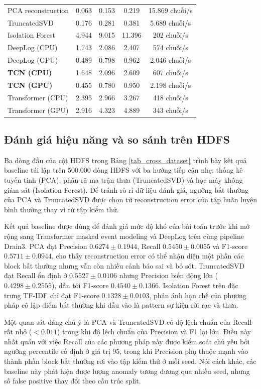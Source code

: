\documentclass[conference]{IEEEtran}
\begin{document}
\begin{table}[!t]
\begin{minipage}[t]{0.48\textwidth}
\begin{center}
\begin{tabular}{lcccc}
PCA reconstruction & 0.063 & 0.153 & 0.219 & 15.869 chuỗi/s \\
TruncatedSVD & 0.176 & 0.281 & 0.381 & 5.689 chuỗi/s \\
Isolation Forest & 4.944 & 9.015 & 11.396 & 202 chuỗi/s \\
DeepLog (CPU) & 1.743 & 2.086 & 2.407 & 574 chuỗi/s \\
DeepLog (GPU) & 0.489 & 0.798 & 0.962 & 2.046 chuỗi/s \\
\textbf{TCN (CPU)} & 1.648 & 2.096 & 2.609 & 607 chuỗi/s \\
\textbf{TCN (GPU)} & 0.455 & 0.780 & 0.950 & 2.198 chuỗi/s \\
Transformer (CPU) & 2.395 & 2.966 & 3.267 & 418 chuỗi/s \\
Transformer (GPU) & 2.916 & 4.323 & 4.889 & 343 chuỗi/s \\
\bottomrule
\end{tabular}
\label{tab_latency}
\end{center}
\end{minipage}
\end{table}

\subsection{Đánh giá hiệu năng và so sánh trên HDFS}
Ba dòng đầu của cột HDFS trong Bảng \ref{tab_cross_dataset} trình bày kết quả baseline tái lập trên 500.000 dòng HDFS với ba hướng tiếp cận nhẹ: thống kê tuyến tính (PCA), phân rã ma trận thưa (TruncatedSVD) và học máy không giám sát (Isolation Forest). Để tránh rò rỉ dữ liệu đánh giá, ngưỡng bất thường của PCA và TruncatedSVD được chọn từ reconstruction error của tập huấn luyện bình thường thay vì từ tập kiểm thử.

Kết quả baseline được dùng để đánh giá mức độ khó của bài toán trước khi mở rộng sang Transformer masked event modeling và DeepLog trên cùng pipeline Drain3. PCA đạt Precision $0.6274 \pm 0.1944$, Recall $0.5450 \pm 0.0055$ và F1-score $0.5711 \pm 0.0944$, cho thấy reconstruction error có thể nhận diện một phần các block bất thường nhưng vẫn còn nhiều cảnh báo sai và bỏ sót. TruncatedSVD đạt Recall ổn định ở $0.5527 \pm 0.0106$ nhưng Precision biến động lớn ($0.4298 \pm 0.2555$), dẫn tới F1-score $0.4540 \pm 0.1366$. Isolation Forest trên đặc trưng TF-IDF chỉ đạt F1-score $0.1328 \pm 0.0103$, phản ánh hạn chế của phương pháp cô lập điểm bất thường khi đầu vào là pattern sự kiện rời rạc và thưa.

Một quan sát đáng chú ý là PCA và TruncatedSVD có độ lệch chuẩn của Recall rất nhỏ ($<0.011$) trong khi độ lệch chuẩn của Precision và F1 lại lớn. Điều này nhất quán với việc Recall của các phương pháp này được kiểm soát chủ yếu bởi ngưỡng percentile cố định ở giá trị 95, trong khi Precision phụ thuộc mạnh vào thành phần block bất thường rơi vào tập kiểm thử ở mỗi seed. Nói cách khác, các baseline này phát hiện được lượng anomaly tương đương qua nhiều seed, nhưng số false positive thay đổi theo cấu trúc split.
\end{document}
